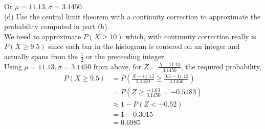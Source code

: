 \documentclass[boxes, qed]{homework}
\begin{document}
\begin{solution}
  Or $\boxed{\mu=11.13, \sigma=3.1450}$\\
  
  (d) Use the central limit theorem with a continuity correction to approximate the probability
  computed in part (b).\\
  
  We need to approximate $P(X\ge{10})$ which, with continuity correction
  really is $P(X\ge{9.5})$ since each bar in the histogram is centered
  on an integer and actually spans from the $\frac{1}{2}$
  or the preceeding integer.\\

  Using $\mu=11.13, \sigma=3.1450$ from above,
  for $Z=\frac{X-11.13}{3.1450}$, the required probability,
  \begin{align*}
    P(X\ge{9.5})
    &= P(\frac{X-11.13}{3.1450}\ge{\frac{9.5-11.13}{3.1450}})\\
    &= P(Z\ge\frac{-1.63}{3.1450}=-0.5183)\\
    &\approx 1-P(Z<-0.52)\\
    &= 1-0.3015\\
    &= \boxed{0.6985}
  \end{align*}
\end{solution}
\end{document}
